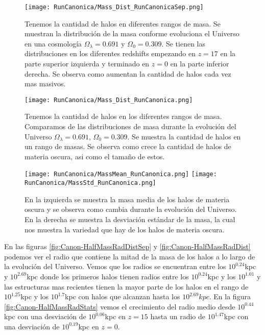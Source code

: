 \begin{figure}[H]
    \centering
    \texttt{[image: RunCanonica/Mass\_Dist\_RunCanonicaSep.png]}
    \caption[Distribución de masa en la evolución de un Universo $\Omega_\lambda = 0.691 $, $\Omega_0 = 0.309$]{\footnotesize Tenemos la cantidad de halos en diferentes rangos de masa. Se muestran la distribución de la masa conforme evoluciona el Universo en una cosmología $\Omega_\lambda = 0.691 $ y $\Omega_0 = 0.309$. Se tienen las distribuciones en los diferentes redshifts empezando en $z=17$ en la parte superior izquierda y terminado en $z=0$ en la parte inferior derecha. Se observa como aumentan la cantidad de halos cada vez mas masivos.}
    \label{fig:Canon-MassDistSep}
\end{figure}

\begin{figure}[H]
    \centering
    \texttt{[image: RunCanonica/Mass\_Dist\_RunCanonica.png]}
    \caption[Comparación de distribución de masa en un Universo $\Omega_\lambda = 0.691 $, $\Omega_0 = 0.309$]{\footnotesize Tenemos la cantidad de halos en los diferentes rangos de masa. Comparamos de las distribuciones de masa durante la evolución del Universo $\Omega_\lambda = 0.691 $, $\Omega_0 = 0.309$. Se muestra la cantidad de halos en un rango de masas. Se observa como crece la cantidad de halos de materia oscura, asi como el tamaño de estos.}
    \label{fig:Canon-MassDist}
\end{figure}

\begin{figure}[H]
    \centering
    \texttt{[image: RunCanonica/MassMean\_RunCanonica.png]}
    \texttt{[image: RunCanonica/MassStd\_RunCanonica.png]}
    \caption[Media y desviación estándar de la distribución de masa de un Universo $\Omega_\lambda = 0.691 $, $\Omega_0 = 0.309$]{\footnotesize En la izquierda se muestra la masa media de los halos de materia oscura y se observa como cambia durante la evolución del Universo. En la derecha se muestra la desviación estándar de la masa, la cual nos muestra la variedad que hay de los halos de materia oscura.}
    \label{fig:Canon-MassStats}
\end{figure}

En las figuras \ref{fig:Canon-HalfMassRadDistSep} y \ref{fig:Canon-HalfMassRadDist} podemos ver el radio que contiene la mitad de la masa de los halos a lo largo de la evolución del Universo. Vemos que los radios se encuentran entre los $10^{0.24}$kpc y $10^{2.69}$kpc donde los primeros halos tienen radios entre los $10^{0.24}$kpc y los $10^{1.01}$ y las estructuras mas recientes tienen la mayor parte de los halos en el rango de $10^{1.25}$kpc y los $10^{1.7}$kpc con halos que alcanzan hasta los $10^{2.69}kpc$. En la figura \ref{fig:Canon-HalfMassRadStats} vemos el crecimiento del radio medio desde $10^{0.44}$kpc con una desviación de $10^{0.06}$kpc en $z=15$ hasta un radio de $10^{1.47}$kpc con una desviación de $10^{0.19}$kpc en $z=0$.

